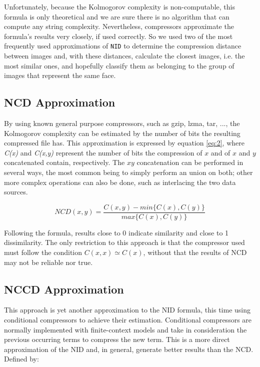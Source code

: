 \documentclass[12pt]{article}
\begin{document}
Unfortunately, because the Kolmogorov complexity is non-computable, this formula is only theoretical and we are sure there is no algorithm that can compute 
any string complexity. 
Nevertheless, compressors approximate the formula's results very closely, if used correctly. 
So we used two of the most frequently used approximations of \texttt{NID} to determine the compression distance between images and, with these distances, 
calculate the closest images, i.e. the most similar ones, and hopefully classify them as belonging to the group of images that represent the same face.

\subsection{NCD Approximation} %

By using known general purpose compressors, such as gzip, lzma, tar, ..., the Kolmogorov complexity can be estimated by the number of bits the resulting compressed file has. 
This approximation is expressed by equation \ref{eq:2}, where \textit{C(x)} and \textit{C(x,y)} represent the number of bits the compression of $x$ and of 
$x$ and $y$ concatenated contain, respectively.
The $xy$ concatenation can be performed in several ways, the most common being to simply perform an union on both; other more complex operations can also be done, 
such as interlacing the two data sources. 

\begin{equation}\label{eq:2}
  NCD(x,y) = \frac{C(x,y)-min\{C(x), C(y)\}}{max\{C(x),C(y)\}}
\end{equation}

Following the formula, results close to 0 indicate similarity and close to 1 dissimilarity. The only restriction to this approach is that the compressor used must follow the condition $C(x,x) \simeq C(x)$, without that the results of NCD may not be reliable nor true. 


\subsection{NCCD Approximation} %

This approach is yet another approximation to the NID formula, this time using conditional compressors to achieve their estimation. Conditional compressors are normally implemented with finite-context models and take in consideration the previous occurring terms to compress the new term. This is a more direct approximation of the NID and, in general, generate better results than the NCD. Defined by:
\end{document}

